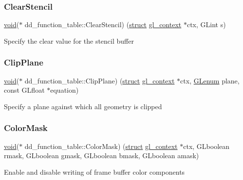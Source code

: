 \subsubsection{\texorpdfstring{Clear\+Stencil}{ClearStencil}}
{\footnotesize\ttfamily \hyperlink{interfacevoid}{void}($\ast$ dd\+\_\+function\+\_\+table\+::\+Clear\+Stencil) (\hyperlink{interfacestruct}{struct} \hyperlink{structgl__context}{gl\+\_\+context} $\ast$ctx, G\+Lint s)}

Specify the clear value for the stencil buffer \mbox{\label{structdd__function__table_acc3d4c85478f91446fe80b3f60f923fd}} 
\subsubsection{\texorpdfstring{Clip\+Plane}{ClipPlane}}
{\footnotesize\ttfamily \hyperlink{interfacevoid}{void}($\ast$ dd\+\_\+function\+\_\+table\+::\+Clip\+Plane) (\hyperlink{interfacestruct}{struct} \hyperlink{structgl__context}{gl\+\_\+context} $\ast$ctx, \hyperlink{interfacevoid}{G\+Lenum} plane, const G\+Lfloat $\ast$equation)}

Specify a plane against which all geometry is clipped \mbox{\label{structdd__function__table_a0f4498a49a4045be1ba912ce28caf884}} 
\subsubsection{\texorpdfstring{Color\+Mask}{ColorMask}}
{\footnotesize\ttfamily \hyperlink{interfacevoid}{void}($\ast$ dd\+\_\+function\+\_\+table\+::\+Color\+Mask) (\hyperlink{interfacestruct}{struct} \hyperlink{structgl__context}{gl\+\_\+context} $\ast$ctx, G\+Lboolean rmask, G\+Lboolean gmask, G\+Lboolean bmask, G\+Lboolean amask)}

Enable and disable writing of frame buffer color components \mbox{\label{structdd__function__table_a3ae0450c56130763cde4a72bd780485f}} 
